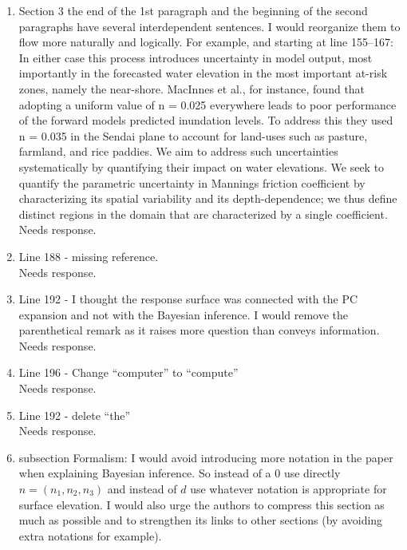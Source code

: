 \documentclass[]{article}
\newcommand{\alert}[1]{{\color{red} #1}}
\begin{document}
\begin{enumerate}
\item Section 3 the end of the 1st paragraph and the beginning of the second paragraphs have several interdependent sentences. I would reorganize them to flow more naturally and logically. For example, and starting at line 155–167:  In either case this process introduces uncertainty in model output, most importantly in the forecasted water elevation in the most important at-risk zones, namely the near-shore. MacInnes et al., for instance, found that adopting a uniform value of n = 0.025 everywhere leads to poor performance of the forward models predicted inundation levels. To address this they used n = 0.035 in the Sendai plane to account for land-uses such as pasture, farmland, and rice paddies. We aim to address such uncertainties systematically by quantifying their impact on water elevations.  We seek to quantify the parametric uncertainty in Mannings friction coefficient by characterizing its spatial variability and its depth-dependence; we thus define distinct regions in the domain that are characterized by a single coefficient. \\

\alert{Needs response.} \\

\item Line 188 - missing reference. \\

\alert{Needs response.} \\

\item Line 192 - I thought the response surface was connected with the PC expansion and not with the Bayesian inference. I would remove the parenthetical remark as it raises more question than conveys information. \\

\alert{Needs response.} \\

\item Line 196 - Change ``computer'' to ``compute'' \\

\alert{Needs response.} \\

\item Line 192 - delete ``the'' \\

\alert{Needs response.} \\

\item subsection Formalism: I would avoid introducing more notation in the paper when explaining Bayesian inference. So instead of a 0 use directly $n = (n_1 , n_2 , n_3 )$ and instead of $d$ use whatever notation is appropriate for surface elevation. I would also urge the authors to compress this section as much as possible and to strengthen its links to other sections (by avoiding extra notations for example). \\


\end{enumerate}
\end{document}
